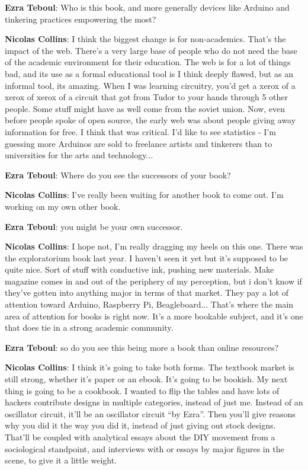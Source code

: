 \textbf{Ezra Teboul}: Who is this book, and more generally devices like Arduino and tinkering practices empowering the most?
					
\textbf{Nicolas Collins}: I think the biggest change is for non-academics. That’s the impact of the web. There’s a very large base of people who do not need the base of the academic environment for their education. The web is for a lot of things bad, and its use as a formal educational tool is I think deeply flawed, but as an informal tool, its amazing. When I was learning circuitry, you’d get a xerox of a xerox of xerox of a circuit that got from Tudor to your hands through 5 other people. Some stuff might have as well come from the soviet union. Now, even before people spoke of open source, the early web was about people giving away information for free. I think that was critical. I’d like to see statistics - I’m guessing more Arduinos are sold to freelance artists and tinkerers than to universities for the arts and technology...
					
\textbf{Ezra Teboul}: Where do you see the successors of your book?
					
\textbf{Nicolas Collins}: I’ve really been waiting for another book to come out. I’m working on my own other book.

\textbf{Ezra Teboul}: you might be your own successor.
					
\textbf{Nicolas Collins}: I hope not, I’m really dragging my heels on this one. There was the exploratorium book last year. I haven’t seen it yet but it’s supposed to be quite nice. Sort of stuff with conductive ink, pushing new materials. Make magazine comes in and out of the periphery of my perception, but i don’t know if they’ve gotten into anything major in terms of that market. They pay a lot of attention toward Arduino, Raspberry Pi, Beagleboard... That’s where the main area of attention for books is right now. It’s a more bookable subject, and it’s one that does tie in a strong academic community.
					
\textbf{Ezra Teboul}: so do you see this being more a book than online resources?
					
\textbf{Nicolas Collins}: I think it’s going to take both forms. The textbook market is still strong, whether it's paper or an ebook. It’s going to be bookish. My next thing is going to be a cookbook. I wanted to flip the tables and have lots of hackers contribute designs in multiple categories, instead of just me. Instead of an oscillator circuit, it’ll be an oscillator circuit ``by Ezra''. Then you’ll give reasons why you did it the way you did it, instead of just giving out stock designs. That’ll be coupled with analytical essays about the DIY movement from a sociological standpoint, and interviews with or essays by major figures in the scene, to give it a little weight.
					
